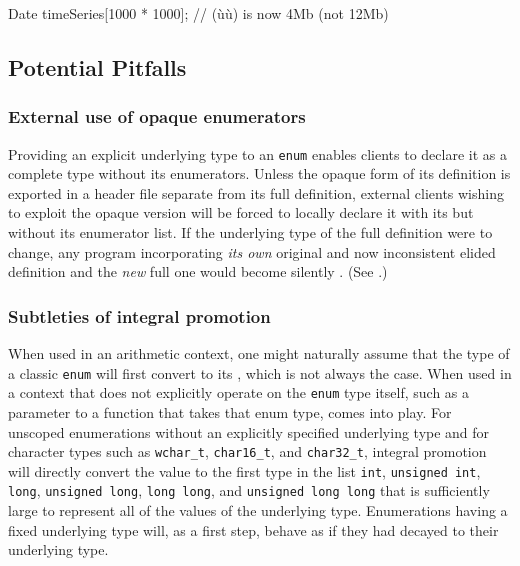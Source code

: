 \begin{emcppslisting}[emcppsbatch=e1]
Date timeSeries[1000 * 1000];  // (ù{}ù) is now 4Mb (not 12Mb)
\end{emcppslisting}


\subsection[Potential Pitfalls]{Potential Pitfalls}\label{potential-pitfalls-underlyingenum}

\subsubsection[External use of opaque enumerators]{External use of opaque enumerators}\label{external-use-of-opaque-enumerators-enumunderlying}

Providing an explicit underlying type to an \lstinline!enum! enables
clients to declare it as a complete type without
its enumerators. Unless the opaque form of its definition is exported in
a header file separate from its full definition, external clients
wishing to exploit the opaque version will be forced to locally declare
it with its  but without its enumerator list. If
the underlying type of the full definition were to change, any program
incorporating \emph{its own} original and now inconsistent elided
definition and the \emph{new} full one would become silently . (See .)

\subsubsection[Subtleties of integral promotion]{Subtleties of integral promotion}\label{subtleties-of-integral-promotion}

When used in an arithmetic context, one might naturally assume that the
type of a classic \lstinline!enum! will first convert to its
, which is not always the case. When used in a
context that does not explicitly operate on the \lstinline!enum! type
itself, such as a parameter to a function that takes that enum type,
 comes into play. For unscoped enumerations
without an explicitly specified underlying type and for character types
such as \lstinline!wchar_t!, \lstinline!char16_t!, and \lstinline!char32_t!,
integral promotion will directly convert the value to the first type in
the list \lstinline!int!, \lstinline!unsigned!~\lstinline!int!, \lstinline!long!,
\lstinline!unsigned!~\lstinline!long!, \lstinline!long!~\lstinline!long!, and
\lstinline!unsigned!~\lstinline!long!~\lstinline!long! that is sufficiently large
to represent all of the values of the underlying type. Enumerations
having a fixed underlying type will, as a first step, behave as if they
had decayed to their underlying type.

